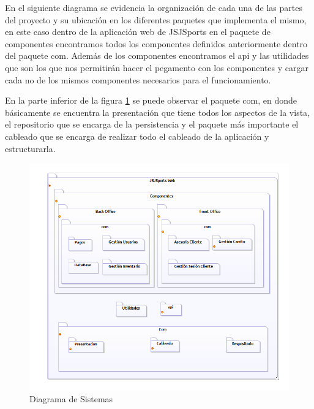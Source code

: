 En el siguiente diagrama se evidencia la organización de cada una de las partes del proyecto y su ubicación en los diferentes paquetes que implementa el mismo, en este caso dentro de la aplicación web de JSJSports en el paquete de componentes encontramos todos los componentes definidos anteriormente dentro del paquete com. Además de los componentes encontramos el api y las utilidades que son los que nos permitirán hacer el pegamento con los componentes y cargar cada no de los mismos componentes necesarios para el funcionamiento.

En la parte inferior de la figura \ref{fig:sistemas} se puede observar el paquete com, en donde básicamente se encuentra la presentación que tiene todos los aspectos de la vista, el repositorio que se encarga de la persistencia y el paquete más importante el cableado que se encarga de realizar todo el cableado de la aplicación y estructurarla.



\begin{figure}[h!]
	\centering
	\includegraphics[width=0.9\linewidth]{arquitectura/imagenes/DiagramaDeSistemas}
	\caption{Diagrama de Sistemas}
	\label{fig:sistemas}
\end{figure}


\newpage

